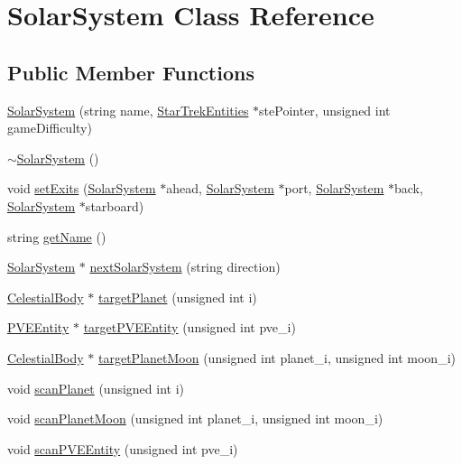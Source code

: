 \hypertarget{classSolarSystem}{
\section{SolarSystem Class Reference}
\label{df/d5e/classSolarSystem}
}
\subsection*{Public Member Functions}
\begin{DoxyCompactItemize}
\item 
\hyperlink{classSolarSystem_a459f5b68b920b9816788e76b6a821488}{SolarSystem} (string name, \hyperlink{classStarTrekEntities}{StarTrekEntities} $\ast$stePointer, unsigned int gameDifficulty)
\item 
\hyperlink{classSolarSystem_ac520dce0faa7df3755326fb2b6f7b51a}{$\sim$SolarSystem} ()
\item 
void \hyperlink{classSolarSystem_a1d7fdbf5b11c2f4cd9b8151390e268a7}{setExits} (\hyperlink{classSolarSystem}{SolarSystem} $\ast$ahead, \hyperlink{classSolarSystem}{SolarSystem} $\ast$port, \hyperlink{classSolarSystem}{SolarSystem} $\ast$back, \hyperlink{classSolarSystem}{SolarSystem} $\ast$starboard)
\item 
string \hyperlink{classSolarSystem_a8493fd255139bae07453818facfe52ce}{getName} ()
\item 
\hyperlink{classSolarSystem}{SolarSystem} $\ast$ \hyperlink{classSolarSystem_a65d3cebc039c25bc4427f72fb20c890c}{nextSolarSystem} (string direction)
\item 
\hyperlink{classCelestialBody}{CelestialBody} $\ast$ \hyperlink{classSolarSystem_a149b4356b3dd7da090b33dc699cc9b7c}{targetPlanet} (unsigned int i)
\item 
\hyperlink{classPVEEntity}{PVEEntity} $\ast$ \hyperlink{classSolarSystem_a92a2a0ae9e987e32e65c46d207a868d7}{targetPVEEntity} (unsigned int pve\_\-i)
\item 
\hyperlink{classCelestialBody}{CelestialBody} $\ast$ \hyperlink{classSolarSystem_af1511d3f14b0be819941f585fef039a0}{targetPlanetMoon} (unsigned int planet\_\-i, unsigned int moon\_\-i)
\item 
void \hyperlink{classSolarSystem_a7be656472d3867ed7eb416da51982463}{scanPlanet} (unsigned int i)
\item 
void \hyperlink{classSolarSystem_a7d9d47e7b7a987f4d2bad4ebe40ac911}{scanPlanetMoon} (unsigned int planet\_\-i, unsigned int moon\_\-i)
\item 
void \hyperlink{classSolarSystem_a92596df0b4af0f979c06f3de7685a74c}{scanPVEEntity} (unsigned int pve\_\-i)

\end{DoxyCompactItemize}

